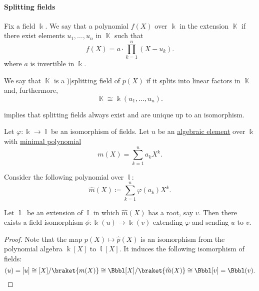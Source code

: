 \paragraph{Splitting fields}

\begin{definition}\label{def:splitting_field}
  Fix a field \( \Bbbk \). We say that a polynomial \( f(X) \) over \( \Bbbk \)  in the extension \( \BbbK \) if there exist elements \( u_1, \ldots, u_n \) in \( \BbbK \) such that
  \begin{equation*}
    f(X) = a \cdot \prod_{k=1}^n (X - u_k).
  \end{equation*}
  where \( a \) is invertible in \( \Bbbk \).

  We say that \( \BbbK \) is a \term[ru=поле разложения (def. \cite[9.5.2]{Винберг2014})]{splitting field} of \( p(X) \) if it splits into linear factors in \( \BbbK \) and, furthermore,
  \begin{equation*}
    \BbbK \cong \Bbbk(u_1, \ldots, u_n).
  \end{equation*}
\end{definition}
\begin{comments}
  \item {} implies that splitting fields always exist and are unique up to an isomorphism.
\end{comments}

\begin{lemma}\label{thm:splitting_field_uniqueness_step}
  Let \( \varphi: \Bbbk \to \Bbbl \) be an isomorphism of fields. Let \( u \) be an \hyperref[def:algebraic_element]{algebraic element} over \( \Bbbk \) with \hyperref[def:algebraic_element_minimal_polynomial]{minimal polynomial}
  \begin{equation*}
     m(X) = \sum_{k=1}^n a_k X^k.
  \end{equation*}

  Consider the following polynomial over \( \Bbbl \):
  \begin{equation*}
    \widehat{m}(X) \coloneqq \sum_{k=1}^n \varphi(a_k) X^k.
  \end{equation*}

  Let \( \BbbL \) be an extension of \( \Bbbl \) in which \( \widehat{m}(X) \) has a root, say \( v \). Then there exists a field isomorphism \( \phi: \Bbbk(u) \to \Bbbk(v) \) extending \( \varphi \) and sending \( u \) to \( v \).
\end{lemma}
\begin{proof}
  Note that the map \( p(X) \mapsto \widehat{p}(X) \) is an isomorphism from the polynomial algebra \( \Bbbk[X] \) to \( \Bbbl[X] \). It induces the following isomorphism of fields:
  \begin{equation*}
    \Bbbk(u) = \Bbbk[u] \cong \Bbbk[X] / \braket{ m(X) } \cong \Bbbl[X] / \braket{ \widehat{m}(X) } \cong \Bbbl[v] = \Bbbl(v).
  \end{equation*}
\end{proof}

